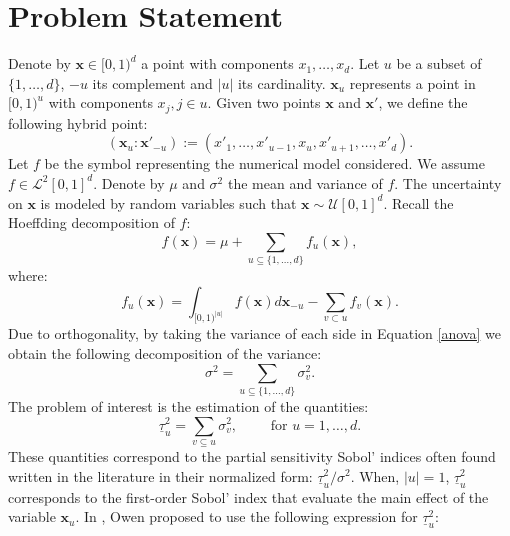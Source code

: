 \documentclass[]{elsarticle}
\theoremstyle{definition}
\newcommand{\bvec}[1]{\boldsymbol{#1}}
\newcommand{\vx}{\bvec{x}}
\begin{document}
\begin{frontmatter}

\title{}

\author{Cl\'ementine Prieur, Elise Arnaud, Herv\'{e} Monod, Laurent Gilquin, Fred J. Hickernell, Llu\'{i}s Antoni Jim\'{e}nez Rugama}
\address{U. Josef Fourier, Illinois Institute of Technology}
\begin{abstract}
\end{abstract}

\end{frontmatter}

\section{Problem Statement}
Denote by $\vx \in [0,1)^d$ a point with components $x_1,\dots,x_d$. Let $u$ be a subset of $\{1,\dots,d\}$, $-u$ its complement and $|u|$ its cardinality. $\vx_u$ represents a point in $[0,1)^u$ with components $x_j, j \in u$. Given two points $\vx$ and $\vx'$, we define the following hybrid point: 
\[(\vx_u:{\vx'}_{-u}) := ({x'}_1,\dots,{x'}_{u-1},x_u,{x'}_{u+1},\dots,{x'}_d).\]
Let $f$ be the symbol representing the numerical model considered. We assume $f \in \mathcal{L}^2[0,1]^d$. Denote by $\mu$ and $\sigma^2$ the mean and variance of $f$.
The uncertainty on $\vx$ is modeled by random variables such that $\vx \sim \mathcal{U}[0,1]^d$. Recall the Hoeffding decomposition of $f$:
\begin{equation}
f(\vx)=\mu+\sum \limits_{u \subseteq \{1,\dots,d\}} f_u(\vx),
\label{anova}
\end{equation}
where:
\[f_u(\vx)= \int_{[0,1)^{|u|}} f(\vx) d{\vx}_{-u} - \sum \limits_{v \subset u} f_v(\vx).\]
Due to orthogonality, by taking the variance of each side in Equation \ref{anova} we obtain the following decomposition of the variance:
\[ \sigma^2 = \sum \limits_{u \subseteq \{1,\dots,d\}} \sigma_v^2.\]
The problem of interest is the estimation of the quantities:
\[\underline{\tau}_u^2 = \sum \limits_{v \subseteq u} \sigma_v^2, \qquad \text{ for } u = 1,\dots,d.\]
These quantities correspond to the partial sensitivity Sobol' indices often found written in the literature in their normalized form: $\underline{\tau}_u^2/\sigma^2$. When, $|u|=1$, $\underline{\tau}_u^2$ corresponds to the first-order Sobol' index that evaluate the main effect of the variable $\vx_u$. In \cite{}, Owen proposed to use the following expression for $\underline{\tau}_u^2$:
\end{document}
